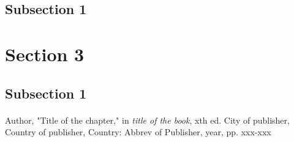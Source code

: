 \documentclass[10pt, a4paper, oneside]{report}
\begin{document}
    \subsection{Subsection 1}
      \paragraph{}
      \paragraph{}
      \paragraph{}
  \section{Section 3}
    \subsection{Subsection 1}
      \paragraph{}
      \paragraph{}
      \paragraph{}
      
\begin{thebibliography}{9}

  Author,
  "Title of the chapter," in 
  \emph{title of the book},
  xth ed.
  City of publisher,
  Country of publisher,
  Country:
  Abbrev of Publisher,
  year,
  pp. xxx-xxx

\end{thebibliography}      
      
\end{document}
